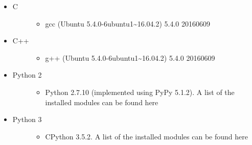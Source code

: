 \documentclass[letterpaper,11pt,english]{sphinxmanual}
\begin{document}
\begin{itemize}
\begin{description}
\begin{itemize}
\begin{description}
\begin{itemize}
\begin{description}
\end{description}

\item {} \begin{description}
\item[{C}] \leavevmode\begin{itemize}
\item {} 
gcc (Ubuntu 5.4.0-6ubuntu1\textasciitilde{}16.04.2) 5.4.0 20160609

\end{itemize}

\end{description}

\item {} \begin{description}
\item[{C++}] \leavevmode\begin{itemize}
\item {} 
g++ (Ubuntu 5.4.0-6ubuntu1\textasciitilde{}16.04.2) 5.4.0 20160609

\end{itemize}

\end{description}

\item {} \begin{description}
\item[{Python 2}] \leavevmode\begin{itemize}
\item {} 
Python 2.7.10 (implemented using PyPy 5.1.2). A list of the installed modules can be found here

\end{itemize}

\end{description}

\item {} \begin{description}
\item[{Python 3}] \leavevmode\begin{itemize}
\item {} 
CPython 3.5.2.  A list of the installed modules can be found here

\end{itemize}

\end{description}

\end{itemize}

\end{description}


\end{itemize}
\end{description}
\end{itemize}
\end{document}

